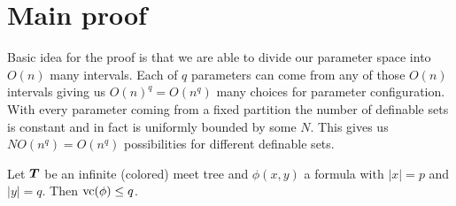\documentclass{amsart}
\DeclareMathOperator{\TT}{\boldface T}
\begin{document}
\section{Main proof}

Basic idea for the proof is that we are able to divide our parameter space into $O(n)$ many intervals. Each of $q$ parameters can come from any of those $O(n)$ intervals giving us $O(n)^q = O(n^q)$ many choices for parameter configuration. With every parameter coming from a fixed partition the number of definable sets is constant and in fact is uniformly bounded by some $N$. This gives us $N O(n^q) = O(n^q)$ possibilities for different definable sets.

\begin{Theorem}
	Let $\TT$ be an infinite (colored) meet tree and $\phi(x, y)$ a formula with $|x| = p$ and $|y| = q$. Then $\operatorname{vc}(\phi) \leq q$.
\end{Theorem}
\end{document}
